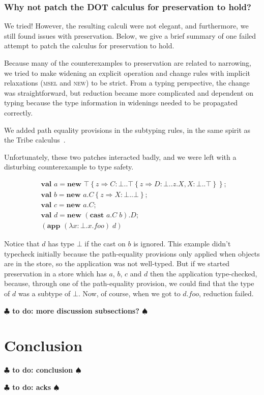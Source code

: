 \documentclass[9pt]{sigplanconf}
\newcommand{\remark}[1]{{\bf $\clubsuit$ #1 $\spadesuit$}}
\newcommand{\todo}[1]{\remark{to do: #1}}
\newcommand{\refine}[2]{\left\{#1 \Rightarrow #2 \right\}}
\newcommand{\abs}[3]{\lambda #1\!:\!#2.#3}
\newcommand{\mlnew}[3]{\textbf{val }#1 = \textbf{new }#2 ;\;\\&#3}
\newcommand{\Ldecl}[3]{#1 : #2..#3}%
\newcommand{\Top}{\top}%
\newcommand{\Bot}{\bot}%
\newcommand{\app}[2]{(\textbf{app }#1\;#2)}
\newcommand{\cast}[2]{(\textbf{cast }#1\;#2)}
\begin{document}
\subsubsection{Why not patch the DOT calculus for preservation to hold?}

We tried! However, the resulting calculi were not elegant, and
furthermore, we still found issues with preservation. Below, we give a
brief summary of one failed attempt to patch the calculus for
preservation to hold.

Because many of the counterexamples to preservation are related to
narrowing, we tried to make widening an explicit operation and change
rules with implicit relaxations (\textsc{msel} and \textsc{new}) to be
strict. From a typing perspective, the change was straightforward, but
reduction became more complicated and dependent on typing because the
type information in widenings needed to be propagated correctly.

We added path equality provisions in the subtyping rules, in the same
spirit as the Tribe calculus~\cite{tribe}.

Unfortunately, these two patches interacted badly, and we were left
with a disturbing counterexample to type safety.

\begin{align*}
&\mlnew a {\Top \refine z {\Ldecl C \Bot {\Top \refine z {\Ldecl D \Bot {z.X}, \Ldecl X \Bot \Top}}}}{
\mlnew b {{a.C} \refine z {\Ldecl X \Bot \Bot}}}{
\mlnew c {a.C}}{
\mlnew d {{\cast {a.C} b}.D}}{
\app {(\abs x \Bot {x.\mathit{foo}})} d
}
\end{align*}

Notice that $d$ has type $\Bot$ if the cast on $b$ is ignored. This
example didn't typecheck initially because the path-equality
provisions only applied when objects are in the store, so the
application was not well-typed. But if we started preservation in a store
which has $a$, $b$, $c$ and $d$ then the application type-checked,
because, through one of the path-equality provision, we could find that
the type of $d$ was a subtype of $\Bot$. Now, of course, when we got to
$d.\mathit{foo}$, reduction failed.

\todo{more discussion subsections?}

\section{Conclusion}\label{conclusion}
\todo{conclusion}


\acks
\todo{acks}



\end{document}
